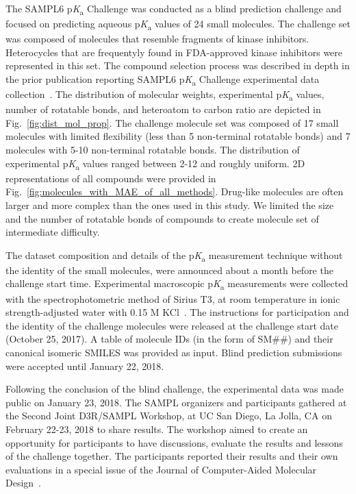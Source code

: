 \documentclass[9pt,lineno,final]{elife}
\newcommand{\pKa}{p\textit{K}\textsubscript{a}}
\begin{document}
The SAMPL6 \pKa{} Challenge was conducted as a blind prediction challenge and focused on predicting aqueous \pKa{} values of 24 small molecules. The challenge set was composed of molecules that resemble fragments of kinase inhibitors. Heterocycles that are frequentyly found in FDA-approved kinase inhibitors were represented in this set. 
The compound selection process was described in depth in the prior publication reporting SAMPL6 \pKa{} Challenge experimental data collection~\citep{Isik:2018:J.Comput.AidedMol.Des.}.
The distribution of molecular weights, experimental \pKa{} values, number of rotatable bonds, and heteroatom to carbon ratio are depicted in Fig.~\ref{fig:dist_mol_prop}. The challenge molecule set was composed of 17 small molecules with limited flexibility (less than 5 non-terminal rotatable bonds) and 7 molecules with 5-10 non-terminal rotatable bonds. 
The distribution of experimental \pKa{} values ranged between 2-12 and roughly uniform. 
2D representations of all compounds were provided in Fig.~\ref{fig:molecules_with_MAE_of_all_methods}. 
Drug-like molecules are often larger and more complex than the ones used in this study. We limited the size and the number of rotatable bonds of compounds to create molecule set of intermediate difficulty.

The dataset composition and details of the \pKa{} measurement technique without the identity of the small molecules, were announced about a month before the challenge start time. 
Experimental macroscopic \pKa{} measurements were collected with the spectrophotometric method of Sirius T3, at room temperature in ionic strength-adjusted water with 0.15 M KCl~\citep{Isik:2018:J.Comput.AidedMol.Des.}. 
The instructions for participation and the identity of the challenge molecules were released at the challenge start date (October 25, 2017). 
A table of molecule IDs (in the form of SM\#\#) and	their canonical isomeric SMILES was provided as input.
Blind prediction submissions were accepted until January 22, 2018. 

Following the conclusion of the blind challenge, the experimental data was made public on January 23, 2018. The SAMPL organizers and participants gathered at the Second Joint D3R/SAMPL Workshop, at UC San Diego, La Jolla, CA on February 22-23, 2018 to share results.
The workshop aimed to create an opportunity for participants to have discussions, evaluate the results and lessons of the challenge together. 
The participants reported their results and their own evaluations in a special issue of the Journal of Computer-Aided Molecular Design~\citep{JCAMD_special_issue_pKa}. 
\end{document}
